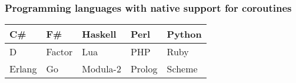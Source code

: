 \subsubsection*{Programming languages with native support for coroutines}

\begin{tabular}{ l l l l l }
    \midrule

    C\# & F\# & Haskell & Perl & Python \\

    \midrule

    D & Factor & Lua & PHP & Ruby \\

    \midrule

    Erlang & Go & Modula-2 & Prolog & Scheme \\

    \midrule
\end{tabular}
